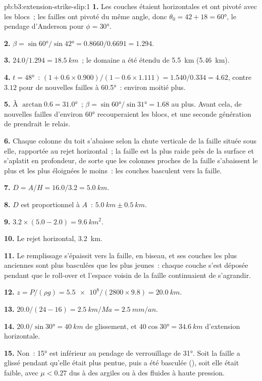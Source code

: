 \begin{solution}{pb:b3:extension-strike-slip:1}
\textbf{1.} Les couches étaient horizontales et ont pivoté avec les blocs~; les
failles ont pivoté du même angle, donc $\theta_0 = 42 + 18 = \ang{60}$,
le pendage d'Anderson pour $\phi = \ang{30}$.

\textbf{2.} $\beta = \sin\ang{60}/\sin\ang{42} = 0.8660/0.6691 = 1.294$.

\textbf{3.} $24.0/1.294 = \qty{18.5}{km}$~; le domaine a été étendu de
\qty{5.5}{km} (\qty{5.46}{km}).

\textbf{4.} $t = \ang{48}$~: $(1 + 0.6\times0.900)/(1 - 0.6\times1.111) =
1.540/0.334 = 4.62$, contre $3.12$ pour de nouvelles failles à \ang{60.5}~: environ
moitié plus.

\textbf{5.} À $\arctan0.6 = \ang{31.0}$~; $\beta = \sin\ang{60}/\sin\ang{31}
= 1.68$ au plus. Avant cela, de nouvelles failles d'environ \ang{60} recouperaient les
blocs, et une seconde génération de  prendrait le relais.

\textbf{6.} Chaque colonne du toit s'abaisse selon la chute verticale de la faille
située sous elle, rapportée au rejet horizontal~; la faille est la plus raide près de la surface et s'aplatit
en profondeur, de sorte que les colonnes proches de la faille s'abaissent le plus et les plus éloignées
le moins~: les couches basculent vers la faille.

\textbf{7.} $D = A/H = 16.0/3.2 = \qty{5.0}{km}$.

\textbf{8.} $D$ est proportionnel à $A$~: $\qty{5.0}{km} \pm \qty{0.5}{km}$.

\textbf{9.} $3.2\times(5.0 - 2.0) = \qty{9.6}{km^2}$.

\textbf{10.} Le rejet horizontal, \qty{3.2}{km}.

\textbf{11.} Le remplissage s'épaissit vers la faille, en biseau, et ses couches les plus
anciennes sont plus basculées que les plus jeunes~: chaque couche s'est déposée pendant que
le roll-over et l'espace voisin de la faille continuaient de s'agrandir.

\textbf{12.} $z = P/(\rho g) = \num{5.5e8}/(2800\times9.8) = \qty{20.0}{km}$.

\textbf{13.} $20.0/(24 - 16) = \qty{2.5}{km/Ma} = \qty{2.5}{mm/an}$.

\textbf{14.} $20.0/\sin\ang{30} = \qty{40}{km}$ de glissement, et $40\cos\ang{30} =
\qty{34.6}{km}$ d'extension horizontale.

\textbf{15.} Non~: \ang{15} est inférieur au pendage de verrouillage de \ang{31}. Soit la
faille a glissé pendant qu'elle était plus pentue, puis a été basculée (), soit
elle était faible, avec $\mu < 0.27$ dus à des argiles ou à des fluides à haute pression.


\end{solution}
